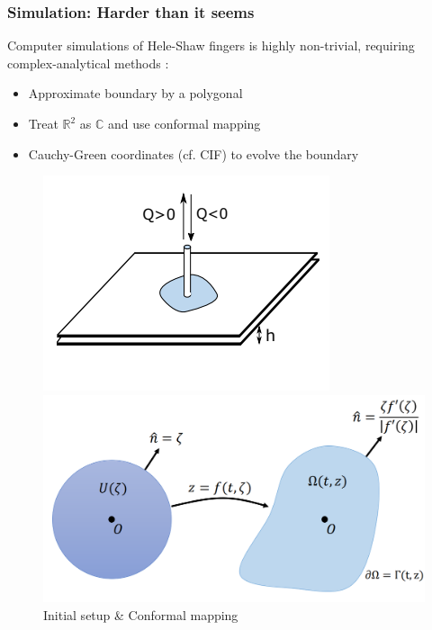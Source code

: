 \documentclass{beamer}
\begin{document}
\begin{frame}
\frametitle{Simulation: Harder than it seems}
Computer simulations of Hele-Shaw fingers is highly non-trivial, requiring complex-analytical methods \cite{Simulate}:
\begin{itemize}
    \item Approximate boundary by a polygonal
    \item Treat $\mathbb{R}^2$ as $\mathbb{C}$ and use conformal mapping
    \item Cauchy-Green coordinates (cf. CIF) to evolve the boundary
\end{itemize}
\begin{figure}[!tbp]
    \centering
    \begin{minipage}[b]{0.45\textwidth}
    \includegraphics[scale=0.5]{sim_1.PNG}
    \end{minipage}
    \hspace{-20pt}
    \begin{minipage}[b]{0.45\textwidth}
    \includegraphics[scale=0.2]{sim_2.PNG}
    \end{minipage}
    \caption{\cite{Simulate} Initial setup \& Conformal mapping}
    \label{fig:simulation}
\end{figure}
\end{frame}
\end{document}
